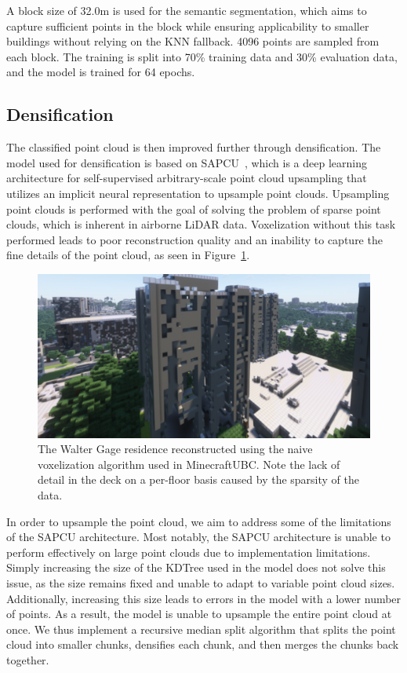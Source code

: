 \documentclass[10pt,twocolumn,letterpaper]{article}
\begin{document}
    A block size of 32.0m is used for the semantic segmentation, which aims to capture sufficient points in the block while ensuring applicability to smaller buildings without relying on the KNN fallback.
    4096 points are sampled from each block.
    The training is split into 70\% training data and 30\% evaluation data, and the model is trained for 64 epochs.

    \subsection{Densification}\label{subsec:densification}

    The classified point cloud is then improved further through densification.
    The model used for densification is based on SAPCU~\cite{sapcu}, which is a deep learning architecture for self-supervised arbitrary-scale point cloud upsampling that utilizes an implicit neural representation to upsample point clouds.
    Upsampling point clouds is performed with the goal of solving the problem of sparse point clouds, which is inherent in airborne LiDAR data.
    Voxelization without this task performed leads to poor reconstruction quality and an inability to capture the fine details of the point cloud, as seen in Figure~\ref{fig:walter_gage_minecraftubc}.

    \begin{figure}
        \centering
        \includegraphics[width=\linewidth]{Walter_Gage.png}
        \caption{The Walter Gage residence reconstructed using the naive voxelization algorithm used in MinecraftUBC. Note the lack of detail in the deck on a per-floor basis caused by the sparsity of the data.}
        \label{fig:walter_gage_minecraftubc}
    \end{figure}

    In order to upsample the point cloud, we aim to address some of the limitations of the SAPCU architecture.
    Most notably, the SAPCU architecture is unable to perform effectively on large point clouds due to implementation limitations.
    Simply increasing the size of the KDTree used in the model does not solve this issue, as the size remains fixed and unable to adapt to variable point cloud sizes.
    Additionally, increasing this size leads to errors in the model with a lower number of points.
    As a result, the model is unable to upsample the entire point cloud at once.
    We thus implement a recursive median split algorithm that splits the point cloud into smaller chunks, densifies each chunk, and then merges the chunks back together.
\end{document}
